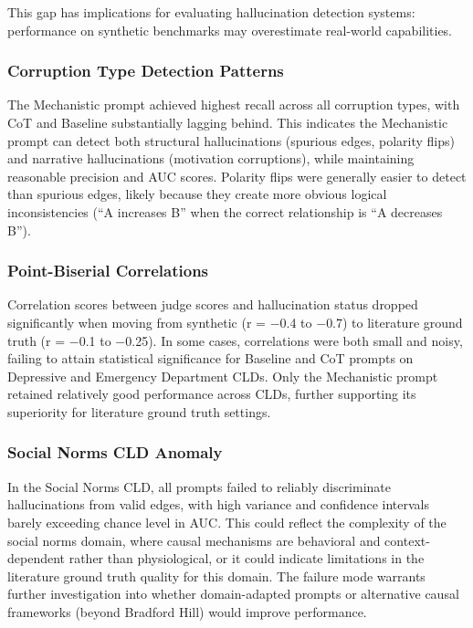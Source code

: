 This gap has implications for evaluating hallucination detection systems: performance on synthetic benchmarks may overestimate real-world capabilities.

\subsubsection{Corruption Type Detection Patterns}

The Mechanistic prompt achieved highest recall across all corruption types, with CoT and Baseline substantially lagging behind. This indicates the Mechanistic prompt can detect both structural hallucinations (spurious edges, polarity flips) and narrative hallucinations (motivation corruptions), while maintaining reasonable precision and AUC scores. Polarity flips were generally easier to detect than spurious edges, likely because they create more obvious logical inconsistencies (``A increases B'' when the correct relationship is ``A decreases B'').

\subsubsection{Point-Biserial Correlations}

Correlation scores between judge scores and hallucination status dropped significantly when moving from synthetic (r = $-$0.4 to $-$0.7) to literature ground truth (r = $-$0.1 to $-$0.25). In some cases, correlations were both small and noisy, failing to attain statistical significance for Baseline and CoT prompts on Depressive and Emergency Department CLDs. Only the Mechanistic prompt retained relatively good performance across CLDs, further supporting its superiority for literature ground truth settings.

\subsubsection{Social Norms CLD Anomaly}

In the Social Norms CLD, all prompts failed to reliably discriminate hallucinations from valid edges, with high variance and confidence intervals barely exceeding chance level in AUC. This could reflect the complexity of the social norms domain, where causal mechanisms are behavioral and context-dependent rather than physiological, or it could indicate limitations in the literature ground truth quality for this domain. The failure mode warrants further investigation into whether domain-adapted prompts or alternative causal frameworks (beyond Bradford Hill) would improve performance.


